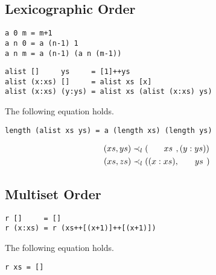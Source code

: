 \subsection{Lexicographic Order}
\begin{verbatim}
a 0 m = m+1
a n 0 = a (n-1) 1
a n m = a (n-1) (a n (m-1))
\end{verbatim}
\begin{verbatim}
alist []     ys     = [1]++ys
alist (x:xs) []     = alist xs [x]
alist (x:xs) (y:ys) = alist xs (alist (x:xs) ys)
\end{verbatim}
\begin{claim}The following equation holds.
\begin{verbatim}
length (alist xs ys) = a (length xs) (length ys)
\end{verbatim}
\end{claim}
\begin{align*}
(xs,ys)&\prec_l(\hphantom{(x:\ }xs\hphantom{)},(y:ys))\\
(xs,zs)&\prec_l((x:xs),\hphantom{(x:\ }ys\hphantom{)})
\end{align*}
\subsection{Multiset Order}
\begin{verbatim}
r []     = []
r (x:xs) = r (xs++[(x+1)]++[(x+1)])
\end{verbatim}
\begin{claim}The following equation holds.
\begin{verbatim}
r xs = []
\end{verbatim}
\end{claim}
